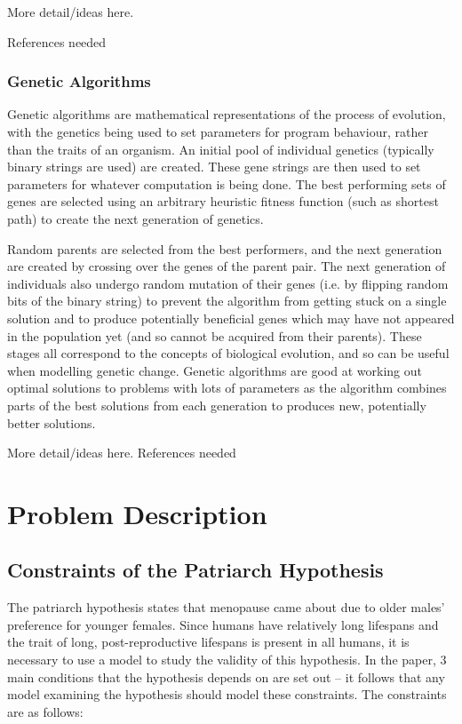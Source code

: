 \documentclass[authoryearcitations]{UoYCSproject}
\begin{document}
\begin{framed}
More detail/ideas here. 

References needed
\end{framed}


\subsection{Genetic Algorithms}
Genetic algorithms are mathematical representations of the process of evolution, with the genetics being used to set parameters for program behaviour, rather than the traits of an organism. An initial pool of individual genetics (typically binary strings are used) are created. These gene strings are then used to set parameters for whatever computation is being done. The best performing sets of genes are selected using an arbitrary heuristic fitness function (such as shortest path) to create the next generation of genetics. 

Random parents are selected from the best performers, and the next generation are created by crossing over the genes of the parent pair. The next generation of individuals also undergo random mutation of their genes (i.e. by flipping random bits of the binary string) to prevent the algorithm from getting stuck on a single solution and to produce potentially beneficial genes which may have not appeared in the population yet (and so cannot be acquired from their parents). These stages all correspond to the concepts of biological evolution, and so can be useful when modelling genetic change. Genetic algorithms are good at working out optimal solutions to problems with lots of parameters as the algorithm combines parts of the best solutions from each generation to produces new, potentially better solutions. 

\begin{framed}
More detail/ideas here. References needed
\end{framed}


\chapter{Problem Description}
\label{cha:Problem Description}

\section{Constraints of the Patriarch Hypothesis}
The patriarch hypothesis \cite{patriarchHypothesis2000} states that menopause came about due to older males' preference for younger females. Since humans have relatively long lifespans and the trait of long, post-reproductive lifespans is present in all humans, it is necessary to use a model to study the validity of this hypothesis. In the paper, 3 main conditions that the hypothesis depends on are set out -- it follows that any model examining the hypothesis should model these constraints. The constraints are as follows:
\end{document}
